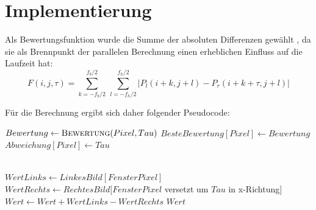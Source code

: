 \documentclass[%
  a4paper,%
  12pt,%
  style=screen, %
  oneside,
  blue,%
  ]{tubsartcl}
\begin{document}
\section{Implementierung}
\label{sec:Implementierung}
Als Bewertungsfunktion wurde die Summe der absoluten Differenzen gewählt \cite{werner2002}, da sie als
\glqq{}Brennpunkt\grqq{} der parallelen Berechnung einen erheblichen Einfluss auf die Laufzeit hat: \\
\begin{equation}
F(i,j,\tau) = \displaystyle\sum_{k=-f_b/2}^{f_b/2} \ \displaystyle\sum_{l=-f_h/2}^{f_h/2}
|P_l(i+k, j+l) - P_r(i+k+\tau, j+l)|
\end{equation}

\newpage
Für die Berechnung ergibt sich daher folgender Pseudocode:
\begin{algorithm}[H]
\caption{}
\begin{algorithmic}
    
      \State $Bewertung \gets \Call{Bewertung}{Pixel, Tau}$
        \State $BesteBewertung[Pixel] \gets Bewertung$
        \State $Abweichung[Pixel] \gets Tau$ 
      \EndIf
    \EndFor
  \EndFor
  
    \\
    \hspace{\algorithmicindent}\hspace{\algorithmicindent}
        $WertLinks \gets LinkesBild[FensterPixel]$\\  
    \hspace{\algorithmicindent}\hspace{\algorithmicindent}
        $WertRechts \gets RechtesBild[FensterPixel$ versetzt um $Tau$ in x-Richtung$]$\\ %
    \hspace{\algorithmicindent}\hspace{\algorithmicindent}
        $Wert \gets Wert + WertLinks - WertRechts $ 
    \EndFor
    \State \Return $Wert$
  \EndFunction
\end{algorithmic}
\end{algorithm}
\end{document}
